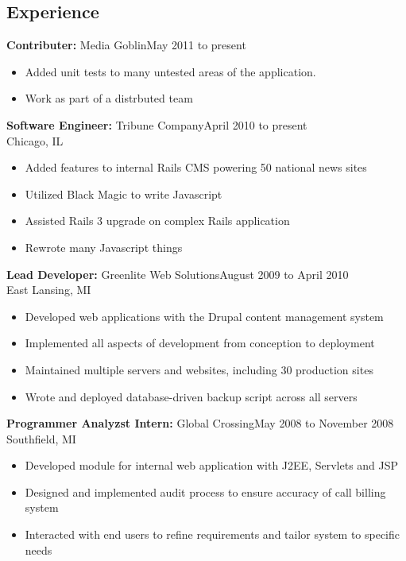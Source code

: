 \documentclass[11pt]{res}
\begin{document}


\begin{resume}


\section{Experience}
{\bf Contributer:} Media Goblin\dotfill May 2011 to present
\begin{itemize}
\item Added unit tests to many untested areas of the application.
\item Work as part of a distrbuted team
\end{itemize}

{\bf Software Engineer:} Tribune Company\dotfill April 2010 to present\\
Chicago, IL
\begin{itemize}
\item Added features to internal Rails CMS powering 50 national news sites
\item Utilized Black Magic to write Javascript
\item Assisted Rails 3 upgrade on complex Rails application
\item Rewrote many Javascript things
\end{itemize}

{\bf Lead Developer:} Greenlite Web Solutions\dotfill August 2009 to April 2010\\
East Lansing, MI
\begin{itemize}
\item Developed web applications with the Drupal content management system
\item Implemented all aspects of development from conception to deployment
\item Maintained multiple servers and websites, including 30 production sites
\item Wrote and deployed database-driven backup script across all servers
\end{itemize}

{\bf Programmer Analyzst Intern:} Global Crossing\dotfill May 2008 to November 2008\\
Southfield, MI
\begin{itemize}
\item Developed module for internal web application with J2EE, Servlets and JSP
\item Designed and implemented audit process to ensure accuracy of call billing system
\item Interacted with end users to refine requirements and tailor system to specific needs
\end{itemize}


\end{resume}
\end{document}
